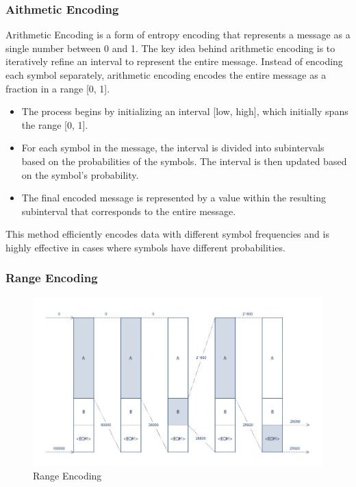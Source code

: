     \subsubsection{Aithmetic Encoding}
    Arithmetic Encoding is a form of entropy encoding that represents a message as a single number between 0 and 1. The key idea behind arithmetic encoding is to iteratively refine an interval to represent the entire message. Instead of encoding each symbol separately, arithmetic encoding encodes the entire message as a fraction in a range [0, 1].

    \begin{itemize}
        \item The process begins by initializing an interval [low, high], which initially spans the range [0, 1].
        \item For each symbol in the message, the interval is divided into subintervals based on the probabilities of the symbols. The interval is then updated based on the symbol's probability.
        \item The final encoded message is represented by a value within the resulting subinterval that corresponds to the entire message.
    \end{itemize}

    This method efficiently encodes data with different symbol frequencies and is highly effective in cases where symbols have different probabilities.

    \subsubsection{Range Encoding}

    \begin{figure}[H]
        \centering
        \includegraphics[width=0.95\linewidth]{assets/Range_encoding.jpg}
        \caption{Range Encoding}
        \label{fig:range_encoding}
    \end{figure}

